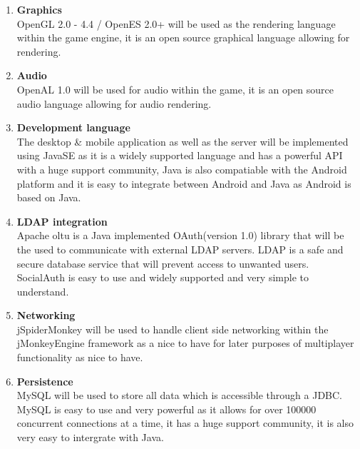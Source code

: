 \documentclass[letterpaper]{article}
\begin{document}
		\begin{enumerate}					
					\item \textbf{Graphics}
					\\OpenGL 2.0 - 4.4 / OpenES 2.0+ will be used as the rendering language within the game engine, it is an open source graphical language allowing for rendering.
					
					\item \textbf{Audio}
					\\OpenAL 1.0 will be used for audio within the game, it is an open source audio language allowing for audio rendering.
					
					\item \textbf{Development language}
					\\The desktop \& mobile application as well as the server will be implemented using JavaSE as it is a widely supported language and has a powerful API with a huge support community, Java is also compatiable with the Android platform and it is easy to integrate between Android and Java as Android is based on Java.
					
					\item \textbf{LDAP integration}
					\\Apache oltu is a Java implemented OAuth(version 1.0) library that will be the used to communicate with external LDAP servers. LDAP is a safe and secure database service that will prevent access to unwanted users. SocialAuth is easy to use and widely supported and very simple to understand.
					
					\item \textbf{Networking}
					\\jSpiderMonkey will be used to handle client side networking within the jMonkeyEngine framework as a nice to have for later purposes of multiplayer functionality as nice to have.
					
					\item \textbf{Persistence}
					\\MySQL will be used to store all data which is accessible through a JDBC. MySQL is easy to use and very powerful as it allows for over 100000 concurrent connections at a time, it has a huge support community, it is also very easy to intergrate with Java.
				\end{enumerate}
			
\end{document}
